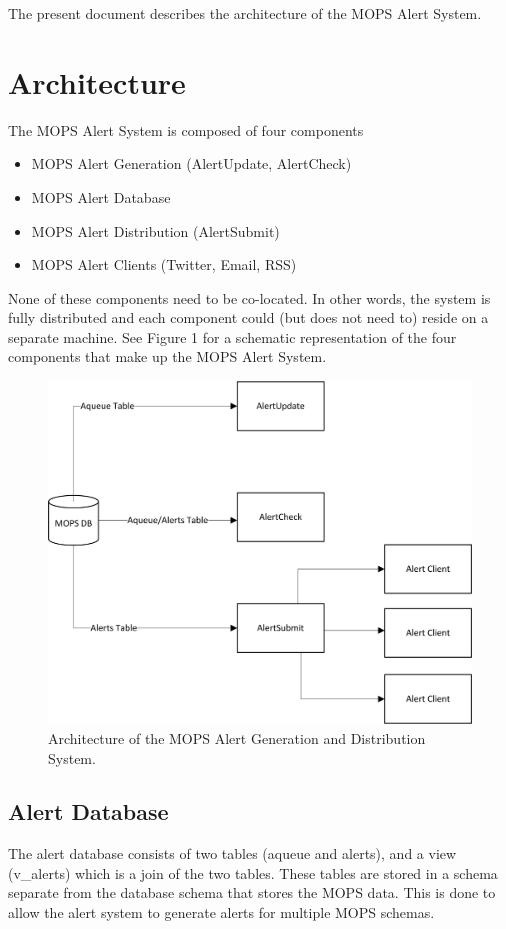 \documentclass[panstarrs]{panstarrs}
\begin{document}
The present document describes the architecture of the MOPS Alert System. 

\section{Architecture}
The MOPS Alert System is composed of four components
\begin{itemize}
\item MOPS Alert Generation (AlertUpdate, AlertCheck)
\item MOPS Alert Database
\item MOPS Alert Distribution (AlertSubmit)
\item MOPS Alert Clients (Twitter, Email, RSS) 
\end{itemize}

None of these components need to be co-located. In other words, the system is fully distributed and each component could (but does not need to) reside on a separate machine. See Figure 1 for a schematic representation of the four components that make up the MOPS Alert System. 

\begin{figure}
\begin{center}
\includegraphics[width=7in]{AlertsArchitecture.jpg}
\caption{Architecture of the MOPS Alert Generation and Distribution System.}
\label{fig:architecture}
\end{center}
\end{figure}

\subsection{Alert Database}
The alert database consists of two tables (aqueue and alerts), and a view (v\_alerts) which is a join of the two tables. These tables are stored in a schema separate from the database schema that stores the MOPS data. This is done to allow the alert system to generate alerts for multiple MOPS schemas.
\end{document}
